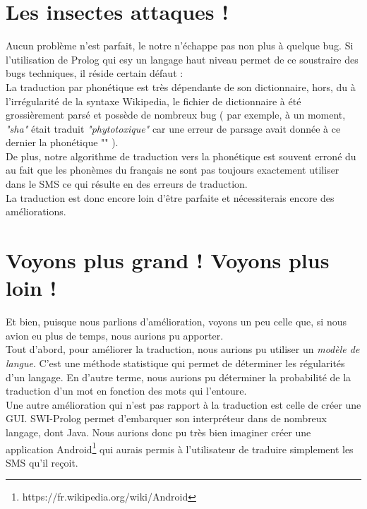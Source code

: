 \documentclass[11pt]{book}
\begin{document}
	\section{Les insectes attaques !}
	Aucun problème n'est parfait, le notre n’échappe pas non plus à quelque bug. Si l'utilisation de Prolog qui esy un langage haut niveau permet de ce soustraire des bugs techniques, il réside certain défaut :\\
	La traduction par phonétique est très dépendante de son dictionnaire, hors, du à l'irrégularité de la syntaxe Wikipedia, le fichier de dictionnaire à été grossièrement parsé et possède de nombreux bug ( par exemple, à un moment, {\em "sha"} était traduit {\em "phytotoxique"} car une erreur de parsage avait donnée à ce dernier la phonétique "" ).\\
	De plus, notre algorithme de traduction vers la phonétique est souvent erroné du au fait que les phonèmes du français ne sont pas toujours exactement utiliser dans le SMS ce qui résulte en des erreurs de traduction.\\
	La traduction est donc encore loin d'être parfaite et nécessiterais encore des améliorations. 
	
	\section{Voyons plus grand ! Voyons plus loin !}
	Et bien, puisque nous parlions d'amélioration, voyons un peu celle que, si nous avion eu plus de temps, nous aurions pu apporter.\\
	Tout d'abord, pour améliorer la traduction, nous aurions pu utiliser un {\em modèle de langue}. C'est une méthode statistique qui permet de déterminer les régularités d'un langage. En d'autre terme, nous aurions pu déterminer la probabilité de la traduction d'un mot en fonction des mots qui l'entoure.\\
	Une autre amélioration qui n'est pas rapport à la traduction est celle de créer une GUI. SWI-Prolog permet d'embarquer son interpréteur dans de nombreux langage, dont Java. Nous aurions donc pu très bien imaginer créer une application Android\footnote{https://fr.wikipedia.org/wiki/Android} qui aurais permis à l'utilisateur de traduire simplement les SMS qu'il reçoit.
	
\end{document}
